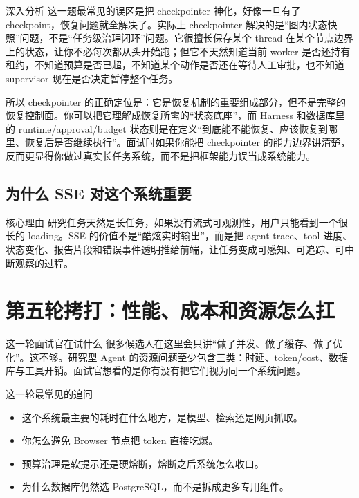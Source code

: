 \documentclass[12pt]{article}
\begin{document}
\begin{analysisBox}{深入分析}
这一题最常见的误区是把 checkpointer 神化，好像一旦有了 checkpoint，恢复问题就全解决了。实际上 checkpointer 解决的是“图内状态快照”问题，不是“任务级治理闭环”问题。它很擅长保存某个 thread 在某个节点边界上的状态，让你不必每次都从头开始跑；但它不天然知道当前 worker 是否还持有租约，不知道预算是否已超，不知道某个动作是否还在等待人工审批，也不知道 supervisor 现在是否决定暂停整个任务。

所以 checkpointer 的正确定位是：它是恢复机制的重要组成部分，但不是完整的恢复控制面。你可以把它理解成恢复所需的“状态底座”，而 Harness 和数据库里的 runtime/approval/budget 状态则是在定义“到底能不能恢复、应该恢复到哪里、恢复后是否继续执行”。面试时如果你能把 checkpointer 的能力边界讲清楚，反而更显得你做过真实长任务系统，而不是把框架能力误当成系统能力。
\end{analysisBox}

\subsection{为什么 SSE 对这个系统重要}
\begin{qaBox}{核心理由}
研究任务天然是长任务，如果没有流式可观测性，用户只能看到一个很长的 loading。SSE 的价值不是“酷炫实时输出”，而是把 agent trace、tool 进度、状态变化、报告片段和错误事件透明推给前端，让任务变成可感知、可追踪、可中断观察的过程。
\end{qaBox}

\section{第五轮拷打：性能、成本和资源怎么扛}

\begin{summaryBox}{这一轮面试官在试什么}
很多候选人在这里会只讲“做了并发、做了缓存、做了优化”。这不够。研究型 Agent 的资源问题至少包含三类：时延、token/cost、数据库与工具开销。面试官想看的是你有没有把它们视为同一个系统问题。
\end{summaryBox}

\begin{qaBox}{这一轮最常见的追问}
\begin{itemize}[leftmargin=2em]
  \item 这个系统最主要的耗时在什么地方，是模型、检索还是网页抓取。
  \item 你怎么避免 Browser 节点把 token 直接吃爆。
  \item 预算治理是软提示还是硬熔断，熔断之后系统怎么收口。
  \item 为什么数据库仍然选 PostgreSQL，而不是拆成更多专用组件。
\end{itemize}
\end{qaBox}
\end{document}
